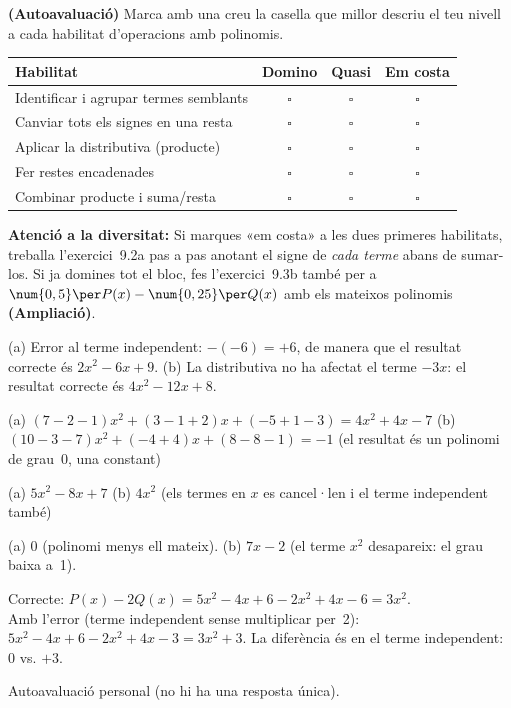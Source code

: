 \begin{exercicis}
\begin{exlist}
  \item \textbf{(Autoavaluació)} Marca amb una creu la casella que millor
        descriu el teu nivell a cada habilitat d'operacions amb polinomis.
        \begin{center}
        \renewcommand{\arraystretch}{1.4}
        \begin{tabular}{|p{6.5cm}|c|c|c|}
        \hline
        \textbf{Habilitat} & \textbf{Domino} & \textbf{Quasi} & \textbf{Em costa} \\
        \hline
        Identificar i agrupar termes semblants & $\square$ & $\square$ & $\square$ \\
        \hline
        Canviar tots els signes en una resta & $\square$ & $\square$ & $\square$ \\
        \hline
        Aplicar la distributiva (producte) & $\square$ & $\square$ & $\square$ \\
        \hline
        Fer restes encadenades & $\square$ & $\square$ & $\square$ \\
        \hline
        Combinar producte i suma/resta & $\square$ & $\square$ & $\square$ \\
        \hline
        \end{tabular}
        \end{center}

\textbf{Atenció a la diversitat:} Si marques «em costa» a les dues
primeres habilitats, treballa l'exercici~9.2a pas a pas anotant el signe
de \emph{cada terme} abans de sumar-los. Si ja domines tot el bloc, fes
l'exercici~9.3b també per a $\num{0,5}\per P(x) - \num{0,25}\per Q(x)$
amb els mateixos polinomis \textbf{(Ampliació)}.
\end{exlist}
\end{exercicis}

\begin{solucions}
\begin{sollist}
  \item (a) Error al terme independent: $-(- 6)=+6$, de manera que el resultat
        correcte és $2x^2-6x+9$. \quad
        (b) La distributiva no ha afectat el terme $-3x$: el resultat
        correcte és $4x^2-12x+8$.
  \item (a) $(7-2-1)x^2+(3-1+2)x+(-5+1-3) = 4x^2+4x-7$ \quad
        (b) $(10-3-7)x^2+(-4+4)x+(8-8-1) = -1$
        (el resultat és un polinomi de grau~0, una constant)
  \item (a) $5x^2-8x+7$ \quad (b) $4x^2$
        (els termes en $x$ es cancel·len i el terme independent també)
  \item (a) $0$ (polinomi menys ell mateix). \quad
        (b) $7x-2$ (el terme $x^2$ desapareix: el grau baixa a~1).
  \item Correcte: $P(x)-2Q(x)=5x^2-4x+6-2x^2+4x-6=3x^2$. \\
        Amb l'error (terme independent sense multiplicar per~2):
        $5x^2-4x+6-2x^2+4x-3=3x^2+3$. La diferència és en el terme
        independent: $0$ vs. $+3$.
  \item Autoavaluació personal (no hi ha una resposta única).
\end{sollist}
\end{solucions}
